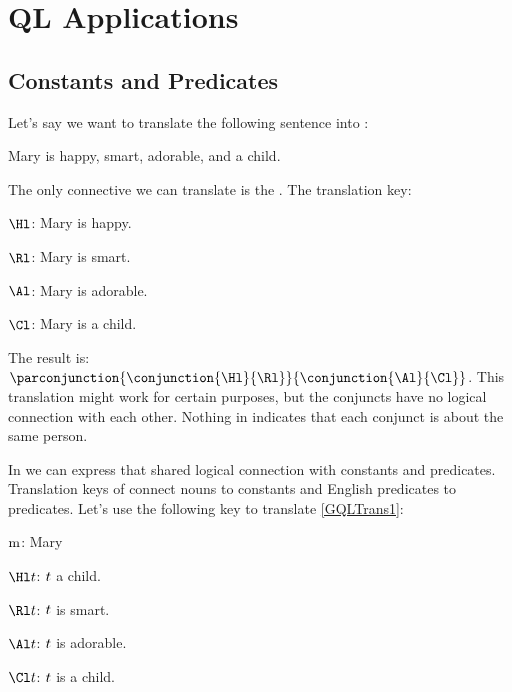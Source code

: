 \section{QL Applications}

\subsection{Constants and Predicates}
Let's say we want to translate the following sentence into \emph{\GSL{}}:

\begin{smenumerate}
	\item\label{GQLTrans1} Mary is happy, smart, adorable, and a child.
\end{smenumerate}

\noindent{}The only connective we can translate is the .
The translation key:

\begin{description}[itemsep=0em]
	\item[Translation Key:] \hfill{} 
	\begin{description}[itemsep=0em]
		\item[] $\Hl$: Mary is happy.
		\item[] $\Rl$: Mary is smart. 
		\item[] $\Al$: Mary is adorable.
		\item[] $\Cl$: Mary is a child.  
	\end{description}
\end{description}

\noindent{}The \GSL{} result is: $\parconjunction{\conjunction{\Hl}{\Rl}}{\conjunction{\Al}{\Cl}}$.
This translation might work for certain purposes, but the conjuncts have no logical connection with each other.
Nothing in \GQL{} indicates that each conjunct is about the same person.

In \GQL{} we can express that shared logical connection with constants and predicates.
Translation keys of \GQL{} connect nouns to constants and English predicates to \GQL{} predicates.
Let's use the following \GQL{} key to translate \ref{GQLTrans1}:

\begin{description}[itemsep=0em]
	\item[Translation Key:] \hfill{} 
	\begin{description}[itemsep=0em]
		\item[] $\mathrm{m}$: Mary
		\item[] $\Hl\variable{t}$: $t$ a child. 
		\item[] $\Rl\variable{t}$: $t$ is smart. 
		\item[] $\Al\variable{t}$: $t$ is adorable.
		\item[] $\Cl\variable{t}$: $t$ is a child.  
	\end{description}
\end{description}

